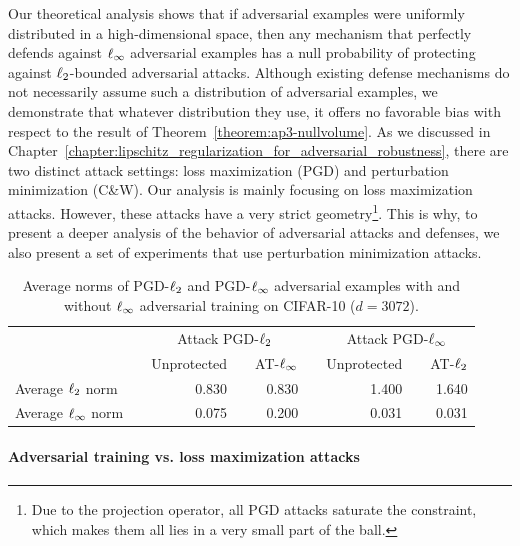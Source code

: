 Our theoretical analysis shows that if adversarial examples were uniformly distributed in a high-dimensional space, then any mechanism that perfectly defends against $\ell_\infty $ adversarial examples has a null probability of protecting against $\ell_2 $-bounded adversarial attacks.
Although existing defense mechanisms do not necessarily assume such a distribution of adversarial examples, we demonstrate that whatever distribution they use, it offers no favorable bias with respect to the result of Theorem~\ref{theorem:ap3-nullvolume}.
As we discussed in Chapter~\ref{chapter:lipschitz_regularization_for_adversarial_robustness}, there are two distinct attack settings: loss maximization (PGD) and perturbation minimization (C\&W).
Our analysis is mainly focusing on loss maximization attacks.
However, these attacks have a very strict geometry\footnote{Due to the projection operator, all PGD attacks saturate the constraint, which makes them all lies in a very small part of the ball.}.
This is why, to present a deeper analysis of the behavior of adversarial attacks and defenses, we also present a set of experiments that use perturbation minimization attacks.

\begin{table}[htbp]
  \centering 
  \begin{tabular}{lrrrrrrrr}
    \toprule
      & \phantom{...}  & \multicolumn{3}{c}{Attack PGD-$\ell_2 $} & \phantom{...}  & \multicolumn{3}{c}{Attack PGD-$\ell_\infty $} \\
  \cmidrule{3-5}\cmidrule{7-9}      &   & \multicolumn{1}{l}{Unprotected} &  \phantom{...} & \multicolumn{1}{l}{AT-$\ell_\infty $} &   & \multicolumn{1}{l}{Unprotected} & \phantom{...}  & \multicolumn{1}{l}{AT-$\ell_2 $} \\
    \midrule
    Average $\ell_2 $ norm &   & 0.830 &   & 0.830 &   & 1.400 &   & 1.640 \\
    Average $\ell_\infty $ norm &   & 0.075 &   & 0.200 &   & 0.031 &   & 0.031 \\
    \bottomrule
  \end{tabular}%
  \caption{Average norms of PGD-$\ell_2 $ and PGD-$\ell_\infty $ adversarial examples with and without $\ell_\infty $ adversarial training on CIFAR-10 ($d=3072$).}
  \label{table:ap3-mean_norm_pgd_attack}
\end{table}%

\paragraph{Adversarial training vs. loss maximization attacks}

